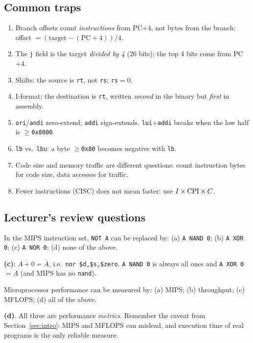\subsection{Common traps}
\begin{enumerate}[leftmargin=*]
  \item Branch offsets count \emph{instructions} from PC$+4$, not bytes from
  the branch: offset $=(\text{target}-(\text{PC}+4))/4$.
  \item The \texttt{j} field is the target \emph{divided by 4} (26 bits); the
  top 4 bits come from PC$+4$.
  \item Shifts: the source is \texttt{rt}, not \texttt{rs}; \texttt{rs}$=0$.
  \item I-format: the destination is \texttt{rt}, written \emph{second} in the
  binary but \emph{first} in assembly.
  \item \texttt{ori}/\texttt{andi} zero-extend; \texttt{addi} sign-extends.
  \texttt{lui}+\texttt{addi} breaks when the low half is $\ge$\texttt{0x8000}.
  \item \texttt{lb} vs.\ \texttt{lbu}: a byte $\ge$\texttt{0x80} becomes
  negative with \texttt{lb}.
  \item Code size and memory traffic are different questions: count
  instruction bytes for code size, data accesses for traffic.
  \item Fewer instructions (CISC) does not mean faster: use $I\times\mathrm{CPI}\times C$.
\end{enumerate}

\subsection{Lecturer's review questions}

\begin{exercise}[Lecturer 1]
In the MIPS instruction set, \texttt{NOT A} can be replaced by:
(a) \texttt{A NAND 0}; (b) \texttt{A XOR 0}; (c) \texttt{A NOR 0}; (d) none of the
above.
\end{exercise}
\begin{solution}
\textbf{(c)}: $\overline{A+0}=\overline{A}$, i.e.\ \texttt{nor \$d,\$s,\$zero}.
\texttt{A NAND 0} is always all ones and \texttt{A XOR 0} $=A$ (and MIPS has no
\texttt{nand}).
\end{solution}

\begin{exercise}[Lecturer 2]
Microprocessor performance can be measured by: (a) MIPS; (b) throughput; (c) MFLOPS;
(d) all of the above.
\end{exercise}
\begin{solution}
\textbf{(d)}. All three are performance \emph{metrics}. Remember the caveat from
Section~\ref{sec:intro}: MIPS and MFLOPS can mislead, and execution time of real
programs is the only reliable measure.
\end{solution}

